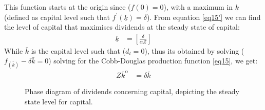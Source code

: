 \documentclass[12pt]{article}
\begin{document}
This function starts at the origin since (\(f(0)=0\)), with a maximum in \(\underline{k}\) (defined as capital level
such that \(f^{\prime}(\underline{k})=\delta\)). From equation \ref{eq15'} we can find the level of capital that maximises dividends
at the steady state of capital:
\begin{align}
    \underline{k} &= \left[\frac{\delta}{\alpha Z}\right]  \label{eq19}
\end{align}
While \(\bar{k}\) is the capital level such that (\(d_t=0\)), thus its obtained by solving (\(f_(\bar{k}) -\delta
\bar{k} = 0\)) solving for the Cobb-Douglas production function \ref{eq15}, we get:
\begin{align}
    Z \bar{k}^{\alpha} &= \delta \bar{k}
\end{align}
\begin{figure}
    \centering
    \caption{Phase diagram of dividends concerning capital, depicting the steady state level for capital.}
\end{figure}
\end{document}
